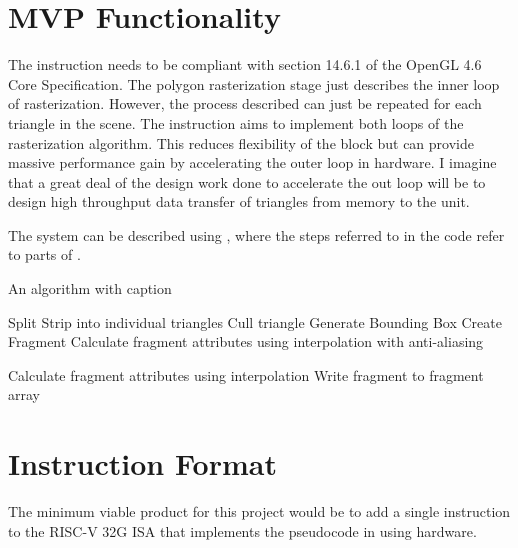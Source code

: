 \section{MVP Functionality}

The instruction needs to be compliant with section 14.6.1 of the OpenGL 4.6 Core Specification. The polygon rasterization stage just describes the inner loop of rasterization. However, the process described can just be repeated for each triangle in the scene. 
The instruction aims to implement both loops of the rasterization algorithm. This reduces flexibility of the block but can provide massive performance gain by accelerating the outer loop in hardware. I imagine that a great deal of the design work done to accelerate the out loop will be to design high throughput data transfer of triangles from memory to the unit.

The system can be described using , where the steps referred to in the code refer to parts of .

\begin{algorithm}
\caption{An algorithm with caption}\label{algorithm:FinalPseudoCode}
\begin{algorithmic}
        \State Split Strip into individual triangles
                \State Cull triangle
            \Else
                \State Generate Bounding Box
                    \State Create Fragment
                        \State Calculate fragment attributes using interpolation with anti-aliasing
                    
                    \Else
                        \State Calculate fragment attributes using interpolation 
                    \EndIf
                \EndFor
                    \State Write fragment to fragment array
            \EndIf
        \EndFor
    \EndFor
\end{algorithmic}
\end{algorithm}

\section{Instruction Format}
The minimum viable product for this project would be to add a single instruction to the RISC-V 32G ISA that implements the pseudocode in  using hardware.

